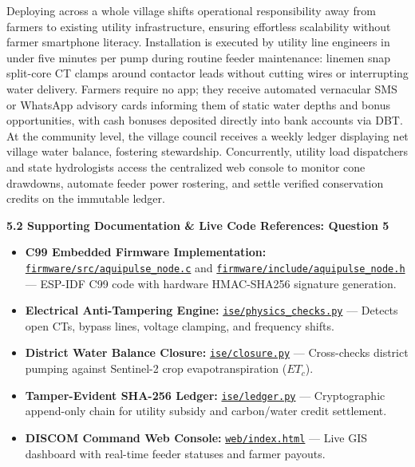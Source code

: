 \documentclass[10pt,a4paper]{article}
\begin{document}
Deploying across a whole village shifts operational responsibility away from farmers to existing utility infrastructure, ensuring effortless scalability without farmer smartphone literacy. Installation is executed by utility line engineers in under five minutes per pump during routine feeder maintenance: linemen snap split-core CT clamps around contactor leads without cutting wires or interrupting water delivery. Farmers require no app; they receive automated vernacular SMS or WhatsApp advisory cards informing them of static water depths and bonus opportunities, with cash bonuses deposited directly into bank accounts via DBT. At the community level, the village council receives a weekly ledger displaying net village water balance, fostering stewardship. Concurrently, utility load dispatchers and state hydrologists access the centralized web console to monitor cone drawdowns, automate feeder power rostering, and settle verified conservation credits on the immutable ledger.

{\small \textbf{\color{secondary}5.2 Supporting Documentation \& Live Code References: Question 5}}
\begin{itemize}[leftmargin=1.5em, itemsep=1pt]
    \item \textbf{C99 Embedded Firmware Implementation:} \href{https://github.com/HirthikBalaji/AquiPulse/blob/main/firmware/src/aquipulse_node.c}{\texttt{firmware/src/aquipulse\_node.c}} and \href{https://github.com/HirthikBalaji/AquiPulse/blob/main/firmware/include/aquipulse_node.h}{\texttt{firmware/include/aquipulse\_node.h}} --- ESP-IDF C99 code with hardware HMAC-SHA256 signature generation.
    \item \textbf{Electrical Anti-Tampering Engine:} \href{https://github.com/HirthikBalaji/AquiPulse/blob/main/ise/physics_checks.py}{\texttt{ise/physics\_checks.py}} --- Detects open CTs, bypass lines, voltage clamping, and frequency shifts.
    \item \textbf{District Water Balance Closure:} \href{https://github.com/HirthikBalaji/AquiPulse/blob/main/ise/closure.py}{\texttt{ise/closure.py}} --- Cross-checks district pumping against Sentinel-2 crop evapotranspiration ($ET_c$).
    \item \textbf{Tamper-Evident SHA-256 Ledger:} \href{https://github.com/HirthikBalaji/AquiPulse/blob/main/ise/ledger.py}{\texttt{ise/ledger.py}} --- Cryptographic append-only chain for utility subsidy and carbon/water credit settlement.
    \item \textbf{DISCOM Command Web Console:} \href{https://github.com/HirthikBalaji/AquiPulse/blob/main/web/index.html}{\texttt{web/index.html}} --- Live GIS dashboard with real-time feeder statuses and farmer payouts.
\end{itemize}
\end{document}
